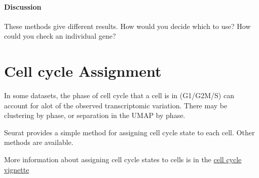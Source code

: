\documentclass[
]{book}
\begin{document}
\hypertarget{discussion}{%
\subsubsection*{Discussion}\label{discussion}}

These methods give different results. How would you decide which to use? How could you check an individual gene?

\hypertarget{section-14}{%
\subsubsection*{}\label{section-14}}

\hypertarget{CellCycle}{%
\chapter{Cell cycle Assignment}\label{CellCycle}}

In some datasets, the phase of cell cycle that a cell is in (G1/G2M/S) can account for
alot of the observed transcriptomic variation. There may be clustering by phase, or
separation in the UMAP by phase.

Seurat provides a simple method for assigning cell cycle state to each cell. Other methods are available.

More information about assigning cell cycle states to cells is in the \href{https://satijalab.org/seurat/articles/cell_cycle_vignette.html}{cell cycle vignette}
\end{document}
